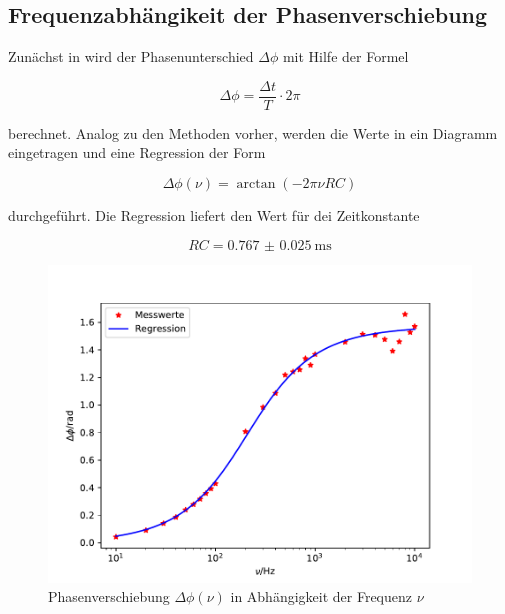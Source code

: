 \subsection{Frequenzabhängikeit der Phasenverschiebung}


Zunächst in wird der Phasenunterschied $\Delta\phi$ mit Hilfe der Formel

\begin{equation*}
  \Delta\phi = \frac{\Delta t}{T} \cdot 2 \pi
\end{equation*}

berechnet. Analog zu den Methoden vorher, werden die Werte in ein Diagramm eingetragen und eine
Regression der Form

\begin{equation*}
  \Delta\phi(\nu) = \arctan (-2 \pi \nu RC)
\end{equation*}

durchgeführt. Die Regression liefert den Wert für dei Zeitkonstante

\begin{equation*}
  RC = \SI{0.767(25)}{\milli\second}
\end{equation*}

\begin{figure}
  \centering
  \includegraphics[scale = 0.7]{plotC.pdf}
  \caption{Phasenverschiebung $\Delta\phi (\nu)$ in Abhängigkeit der Frequenz $\nu$ }
  \label{Plot3}
\end{figure}

